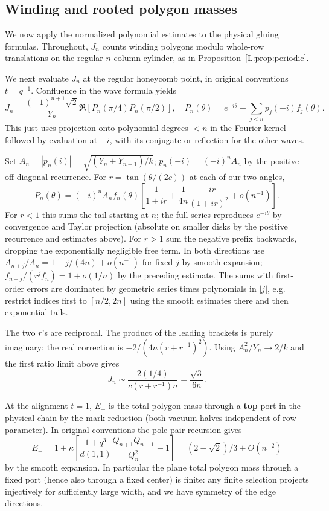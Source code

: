 \documentclass[11pt]{article}
\numberwithin{equation}{section}
\theoremstyle{definition}\newtheorem{definition}[theorem]{Definition}
\theoremstyle{remark}\newtheorem{remark}[theorem]{Remark}
\begin{document}
\subsection{Winding and rooted polygon masses}
We now apply the normalized polynomial estimates to the physical gluing
formulas. Throughout, $J_n$ counts winding polygons modulo whole-row
translations on the regular $n$-column cylinder, as in
Proposition~\ref{L:prop:periodic}.

We next evaluate \(J_n\) at the regular honeycomb point, in original conventions \(t=q^{-1}\). Confluence in the wave formula yields
\[
 J_n=\frac{(-1)^{n+1}\sqrt2}{Y_n}\Re[P_n(\pi/4)P_n(\pi/2)],\quad
 P_n(\theta)=e^{-i\theta}-\sum_{j<n}p_j(-i) f_j(\theta).
\]
This just uses projection onto polynomial degrees \(<n\) in the Fourier kernel followed by evaluation at \(-i\), with its conjugate or reflection for the other waves.

Set \(A_n=|p_n(i)|=\sqrt{(Y_n+Y_{n+1})/k}\); \(p_n(-i)=(-i)^n A_n\) by the positive-off-diagonal recurrence. For \(r=\tan(\theta/(2c))\) at each of our two angles,
\[
 P_n(\theta)=(-i)^n A_n f_n(\theta)
   \left[\frac1{1+i r}+\frac1{4n}\frac{-i r}{(1+i r)^2}+o(n^{-1})\right].
\]
For \(r<1\) this sums the tail starting at \(n\); the full series reproduces \(e^{-i\theta}\) by convergence and Taylor projection (absolute on smaller disks by the positive recurrence and estimates above). For \(r>1\) sum the negative prefix backwards, dropping the exponentially negligible free term. In both directions use \(A_{n+j}/A_n=1+j/(4n)+o(n^{-1})\) for fixed \(j\) by smooth expansion; \(f_{n+j}/(r^j f_n)=1+o(1/n)\) by the preceding estimate. The sums with first-order errors are dominated by geometric series times polynomials in \(|j|\), e.g. restrict indices first to \([n/2,2n]\) using the smooth estimates there and then exponential tails.

The two \(r\)'s are reciprocal. The product of the leading brackets is purely imaginary; the real correction is \(-2/(4n(r+r^{-1})^2)\). Using \(A_n^2/Y_n\to 2/k\) and the first ratio limit above gives
\begin{equation}\label{L:eq:calibrated-winding}
 J_n\sim \frac{2(1/4)}{c(r+r^{-1})n}=\frac{\sqrt3}{6n}.
\end{equation}

At the alignment \(t=1\), \(E_+\) is the total polygon mass through a \textbf{top} port in the physical chain by the mark reduction (both vacuum halves independent of row parameter). In original conventions the pole-pair recursion gives
\begin{equation}\label{L:eq:top-port}
 E_+=1+\kappa\left[\frac{1+q^3}{d(1,1)}\frac{Q_{n+1}Q_{n-1}}{Q_n^2}-1\right]
       = (2-\sqrt2)/3+O(n^{-2})
\end{equation}
by the smooth expansion. In particular the plane total polygon mass through a fixed port (hence also through a fixed center) is finite: any finite selection projects injectively for sufficiently large width, and we have symmetry of the edge directions.
\end{document}

